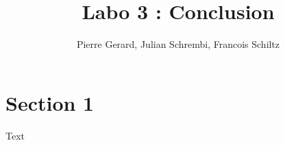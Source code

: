 \documentclass[a4paper]{article}
\title{Labo 3 : Conclusion}
\author{Pierre Gerard, Julian Schrembi, Francois Schiltz}
\begin{document}
\maketitle

\section{Section 1}

Text
\end{document}
